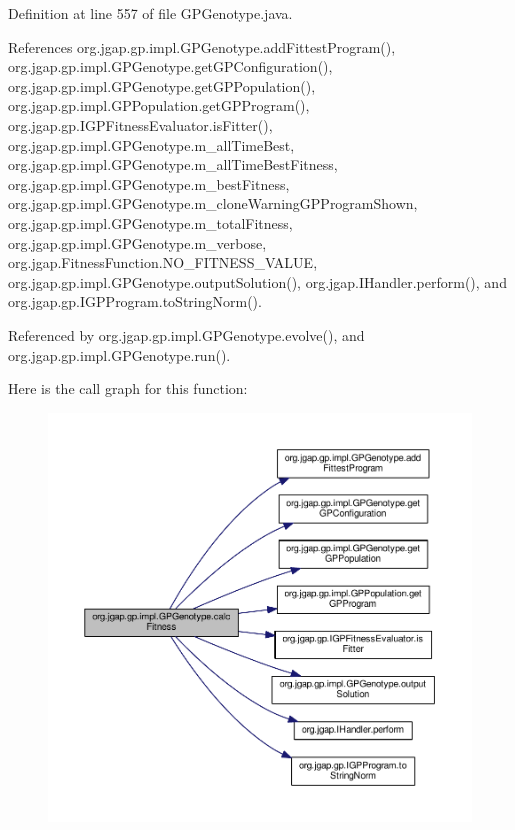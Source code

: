 Definition at line 557 of file G\-P\-Genotype.\-java.



References org.\-jgap.\-gp.\-impl.\-G\-P\-Genotype.\-add\-Fittest\-Program(), org.\-jgap.\-gp.\-impl.\-G\-P\-Genotype.\-get\-G\-P\-Configuration(), org.\-jgap.\-gp.\-impl.\-G\-P\-Genotype.\-get\-G\-P\-Population(), org.\-jgap.\-gp.\-impl.\-G\-P\-Population.\-get\-G\-P\-Program(), org.\-jgap.\-gp.\-I\-G\-P\-Fitness\-Evaluator.\-is\-Fitter(), org.\-jgap.\-gp.\-impl.\-G\-P\-Genotype.\-m\-\_\-all\-Time\-Best, org.\-jgap.\-gp.\-impl.\-G\-P\-Genotype.\-m\-\_\-all\-Time\-Best\-Fitness, org.\-jgap.\-gp.\-impl.\-G\-P\-Genotype.\-m\-\_\-best\-Fitness, org.\-jgap.\-gp.\-impl.\-G\-P\-Genotype.\-m\-\_\-clone\-Warning\-G\-P\-Program\-Shown, org.\-jgap.\-gp.\-impl.\-G\-P\-Genotype.\-m\-\_\-total\-Fitness, org.\-jgap.\-gp.\-impl.\-G\-P\-Genotype.\-m\-\_\-verbose, org.\-jgap.\-Fitness\-Function.\-N\-O\-\_\-\-F\-I\-T\-N\-E\-S\-S\-\_\-\-V\-A\-L\-U\-E, org.\-jgap.\-gp.\-impl.\-G\-P\-Genotype.\-output\-Solution(), org.\-jgap.\-I\-Handler.\-perform(), and org.\-jgap.\-gp.\-I\-G\-P\-Program.\-to\-String\-Norm().



Referenced by org.\-jgap.\-gp.\-impl.\-G\-P\-Genotype.\-evolve(), and org.\-jgap.\-gp.\-impl.\-G\-P\-Genotype.\-run().



Here is the call graph for this function\-:
\nopagebreak
\begin{figure}[H]
\begin{center}
\leavevmode
\includegraphics[width=350pt]{classorg_1_1jgap_1_1gp_1_1impl_1_1_g_p_genotype_aa465c7cbfb45d77644b3d195782a12c9_cgraph}
\end{center}
\end{figure}


